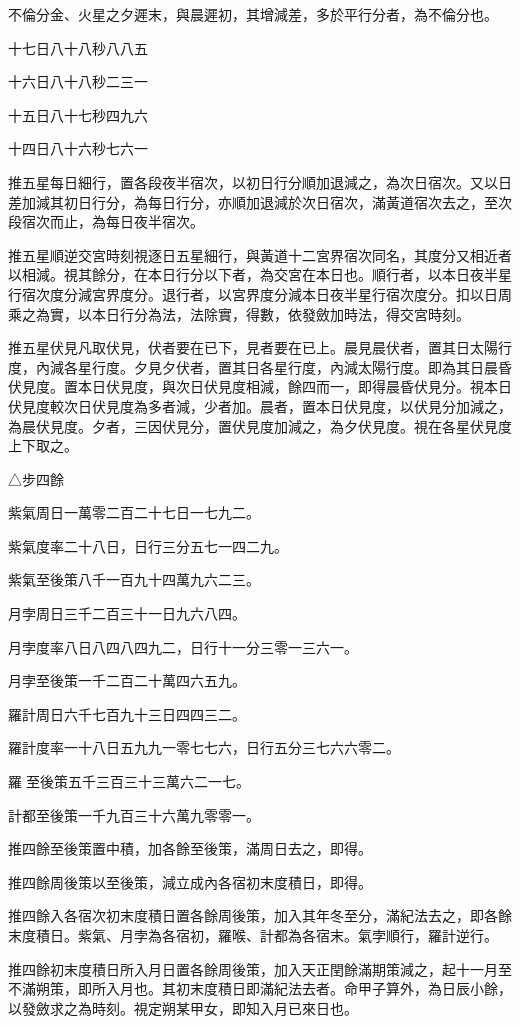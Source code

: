 不倫分金、火星之夕遲末，與晨遲初，其增減差，多於平行分者，為不倫分也。

十七日八十八秒八八五

十六日八十八秒二三一

十五日八十七秒四九六

十四日八十六秒七六一

推五星每日細行，置各段夜半宿次，以初日行分順加退減之，為次日宿次。又以日差加減其初日行分，為每日行分，亦順加退減於次日宿次，滿黃道宿次去之，至次段宿次而止，為每日夜半宿次。

推五星順逆交宮時刻視逐日五星細行，與黃道十二宮界宿次同名，其度分又相近者以相減。視其餘分，在本日行分以下者，為交宮在本日也。順行者，以本日夜半星行宿次度分減宮界度分。退行者，以宮界度分減本日夜半星行宿次度分。扣以日周乘之為實，以本日行分為法，法除實，得數，依發斂加時法，得交宮時刻。

推五星伏見凡取伏見，伏者要在已下，見者要在已上。晨見晨伏者，置其日太陽行度，內減各星行度。夕見夕伏者，置其日各星行度，內減太陽行度。即為其日晨昏伏見度。置本日伏見度，與次日伏見度相減，餘四而一，即得晨昏伏見分。視本日伏見度較次日伏見度為多者減，少者加。晨者，置本日伏見度，以伏見分加減之，為晨伏見度。夕者，三因伏見分，置伏見度加減之，為夕伏見度。視在各星伏見度上下取之。

△步四餘

紫氣周日一萬零二百二十七日一七九二。

紫氣度率二十八日，日行三分五七一四二九。

紫氣至後策八千一百九十四萬九六二三。

月孛周日三千二百三十一日九六八四。

月孛度率八日八四八四九二，日行十一分三零一三六一。

月孛至後策一千二百二十萬四六五九。

羅計周日六千七百九十三日四四三二。

羅計度率一十八日五九九一零七七六，日行五分三七六六零二。

羅至後策五千三百三十三萬六二一七。

計都至後策一千九百三十六萬九零零一。

推四餘至後策置中積，加各餘至後策，滿周日去之，即得。

推四餘周後策以至後策，減立成內各宿初末度積日，即得。

推四餘入各宿次初末度積日置各餘周後策，加入其年冬至分，滿紀法去之，即各餘末度積日。紫氣、月孛為各宿初，羅喉、計都為各宿末。氣孛順行，羅計逆行。

推四餘初末度積日所入月日置各餘周後策，加入天正閏餘滿期策減之，起十一月至不滿朔策，即所入月也。其初末度積日即滿紀法去者。命甲子算外，為日辰小餘，以發斂求之為時刻。視定朔某甲女，即知入月已來日也。


